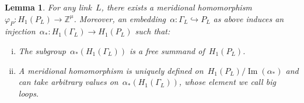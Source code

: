 \documentclass[10.9pt,a4paper]{amsart}
\newtheorem{lemma}[theorem]{Lemma}
\theoremstyle{definition}
\theoremstyle{remark}
\newcommand{\Z}{\mathbb{Z}}
\begin{document}
\begin{lemma}
\label{lemma:MeridionalPL}
For any link~$L$, there exists a meridional homomorphism~$\varphi_P\colon H_1(P_L)\to \Z^\mu$.
Moreover, an embedding~$\alpha\colon\Gamma_L\hookrightarrow P_L$ as above induces an injection~$\alpha_\ast\colon H_1(\Gamma_L)\to H_1(P_L)$ such that:
\begin{enumerate}[(i)]
\item The subgroup~$\alpha_\ast(H_1(\Gamma_L))$ is  a free summand of~$H_1(P_L)$.
\item A meridional homomorphism is uniquely defined on~$H_1(P_L)/\operatorname{Im}(\alpha_\ast)$
and can take arbitrary values on~$\alpha_\ast(H_1(\Gamma_L))$, whose element we call {\em big loops\/}.
\end{enumerate}
\end{lemma}
\end{document}
